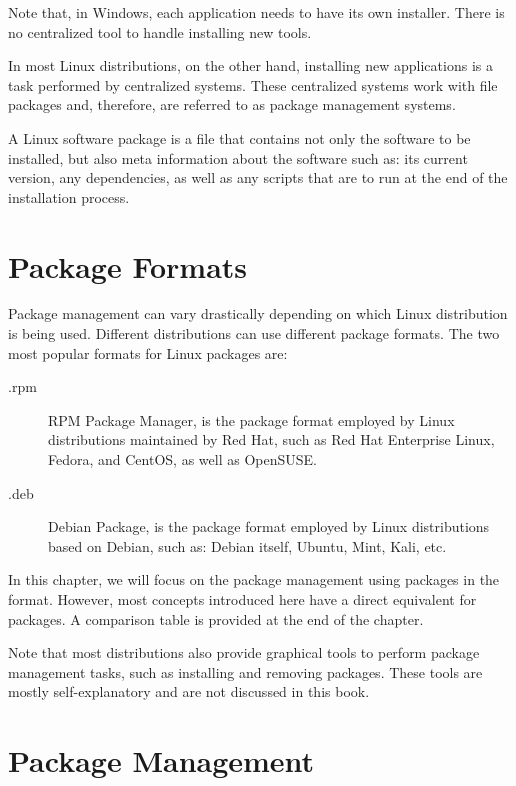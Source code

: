 Note that, in Windows, each application needs to have its own installer. There is no centralized tool to handle installing new tools.

In most Linux distributions, on the other hand, installing new applications is a task performed by centralized systems. These centralized systems work with file packages and, therefore, are referred to as package management systems.

A Linux software package is a file that contains not only the software to be installed, but also meta information about the software such as: its current version, any dependencies, as well as any scripts that are to run at the end of the installation process.

\section{Package Formats}
\label{sec:package_formats}

Package management can vary drastically depending on which Linux distribution is being used. Different distributions can use different package formats. The two most popular formats for Linux packages are:

\begin{description}
\item[.rpm] RPM Package Manager, is the package format employed by Linux distributions maintained by Red Hat, such as Red Hat Enterprise Linux, Fedora, and CentOS, as well as OpenSUSE.
\item[.deb] Debian Package, is the package format employed by Linux distributions based on Debian, such as: Debian itself, Ubuntu, Mint, Kali, etc.
\end{description}

In this chapter, we will focus on the package management using packages in the  format. However, most concepts introduced here have a direct equivalent for  packages. A comparison table is provided at the end of the chapter.

Note that most distributions also provide graphical tools to perform package management tasks, such as installing and removing packages. These tools are mostly self-explanatory and are not discussed in this book.

\section{Package Management}

